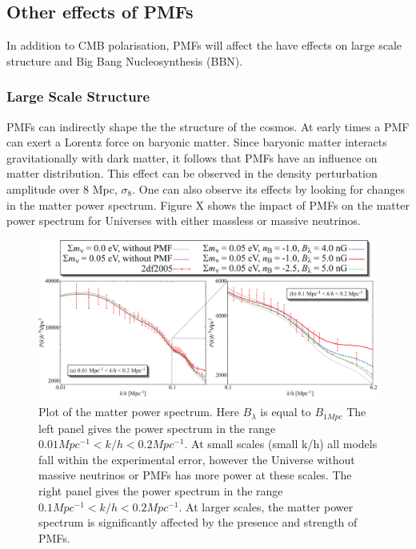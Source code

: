 \subsection{Other effects of PMFs}

In addition to CMB polarisation, PMFs will affect the have effects on large scale structure and Big Bang Nucleosynthesis (BBN).

\subsubsection*{Large Scale Structure}

PMFs can indirectly shape the the structure of the cosmos. At early times a PMF can exert a Lorentz force on baryonic matter. Since baryonic matter interacts gravitationally with dark matter, it follows that PMFs have an influence on matter distribution. This effect can be observed in the density perturbation amplitude over 8 Mpc, $\sigma_8$. One can also observe its effects by looking for changes in the matter power spectrum. Figure X shows the impact of PMFs on the matter power spectrum for Universes with either massless or massive neutrinos.
\\
\begin{figure}[h]
\centering
\includegraphics[scale=1.1]{images/matterpower.png} 
\caption{Plot of the matter power spectrum. Here $B_{\lambda}$ is equal to $B_{1Mpc}$ The left panel gives the power spectrum in the range $0.01 Mpc^{-1} < k/h < 0.2 Mpc^{-1}$. At small scales (small k/h) all models fall within the experimental error, however the Universe without massive neutrinos or PMFs has more power at these scales. The right panel gives the power spectrum in the range $0.1 Mpc^{-1} < k/h < 0.2 Mpc^{-1}$. At larger scales, the matter power spectrum is significantly affected by the presence and strength of PMFs.}
\end{figure}
\\

